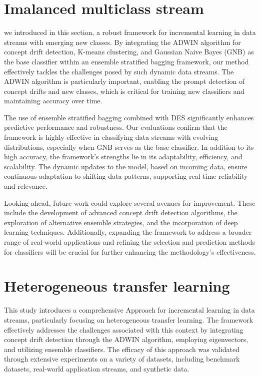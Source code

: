 \section{Imalanced multiclass stream}
\label{section:7_2}
we introduced in this section, a robust framework for incremental learning in data streams with emerging new classes. By integrating the ADWIN algorithm for concept drift detection, K-means clustering, and Gaussian Naive Bayes (GNB) as the base classifier within an ensemble stratified bagging framework, our method effectively tackles the challenges posed by such dynamic data streams. The ADWIN algorithm is particularly important, enabling the prompt detection of concept drifts and new classes, which is critical for training new classifiers and maintaining accuracy over time.

The use of ensemble stratified bagging combined with DES significantly enhances predictive performance and robustness. Our evaluations confirm that the framework is highly effective in classifying data streams with evolving distributions, especially when GNB serves as the base classifier. In addition to its high accuracy, the framework's strengths lie in its adaptability, efficiency, and scalability. The dynamic updates to the model, based on incoming data, ensure continuous adaptation to shifting data patterns, supporting real-time reliability and relevance.

Looking ahead, future work could explore several avenues for improvement. These include the development of advanced concept drift detection algorithms, the exploration of alternative ensemble strategies, and the incorporation of deep learning techniques. Additionally, expanding the framework to address a broader range of real-world applications and refining the selection and prediction methods for classifiers will be crucial for further enhancing the methodology's effectiveness.

\section{Heterogeneous transfer learning}
\label{section:7_2}

This study introduces a comprehensive Approach for incremental learning in data streams, particularly focusing on heterogeneous transfer learning. The framework effectively addresses the challenges associated with this context by integrating concept drift detection through the ADWIN algorithm, employing eigenvectors, and utilizing ensemble classifiers. The efficacy of this approach was validated through extensive experiments on a variety of datasets, including benchmark datasets, real-world application streams, and synthetic data.

